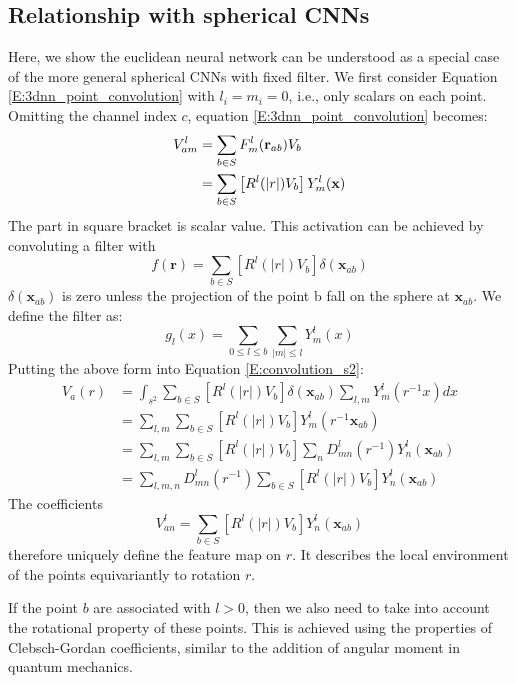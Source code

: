 \documentclass{article}
\begin{document}
\subsection*{Relationship with spherical CNNs}
Here, we show the euclidean neural network can be understood as a special case of the more general spherical CNNs 
with fixed filter.
We first consider Equation \eqref{E:3dnn_point_convolution} with $l_i=m_i=0$, i.e., only scalars on each point. 
Omitting the channel index $c$, 
equation \eqref{E:3dnn_point_convolution} becomes:
\begin{align}
    V_{am}^{l} &= \sum_{b \in S} F_{m}^{l}(\mathbf{r}_{ab}) V_{b}  \notag\\
            &= \sum_{b \in S} \left[R^{l} (|r|)V_{b}\right] Y_{m}^{l}(\mathbf{x})
\end{align}
The part in square bracket is scalar value. This activation can be achieved by convoluting a filter with
\begin{equation}
    f(\mathbf{r}) = \sum_{b \in S} \left[R^{l} (|r|)V_{b}\right] \delta(\mathbf{x}_{ab})
\end{equation}
$\delta(\mathbf{x}_{ab})$ is zero unless the projection of the point b fall on the sphere at $\mathbf{x}_{ab}$. 
We define the filter as:
\begin{equation}
    g_l(x) = \sum_{0\leq l \leq b} \sum_{|m|\leq l} Y_m^l(x)
\end{equation}
Putting the above form into Equation \eqref{E:convolution_s2}:
\begin{align*}
    V_a (r) &= \int_{s^2} \sum_{b \in S} \left[R^{l} (|r|)V_{b}\right] \delta(\mathbf{x}_{ab}) \sum_{l,m} Y_m^l(r^{-1}x) dx \\
    &= \sum_{l,m} \sum_{b \in S} \left[R^{l} (|r|)V_{b}\right] Y_m^l(r^{-1}\mathbf{x}_{ab}) \\
    &= \sum_{l,m} \sum_{b \in S} \left[R^{l} (|r|)V_{b}\right] \sum_n D_{mn}^l(r^{-1}) Y_n^l(\mathbf{x}_{ab}) \\
    &= \sum_{l,m,n} D_{mn}^l(r^{-1}) \sum_{b \in S} \left[R^{l} (|r|)V_{b}\right] Y_n^l(\mathbf{x}_{ab})
\end{align*}
The coefficients \[V_{an}^l = \sum_{b \in S} \left[R^{l} (|r|)V_{b}\right] Y_n^l(\mathbf{x}_{ab})\] therefore uniquely define 
the feature map on $r$. It describes the local environment of the points equivariantly to rotation $r$.

If the point $b$ are associated with $l>0$, then we also need to take into account the rotational property of these points. This is 
achieved using the properties of Clebsch-Gordan coefficients, similar to the addition of angular moment in quantum mechanics.
\end{document}
